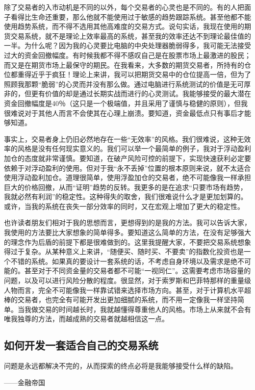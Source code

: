 除了交易者的入市动机是不同的以外，每个交易者的心灵也是不同的。有的人把面子看得比生命还重要，那么他就不能使用过于敏感的趋势跟踪系统。甚至他都不能使用趋势系统，而不得不选用其他高难度的交易方式。说句实话，我现在使用的期货交易系统，就不是理论上效率最高的系统，甚至我的效率还达不到理论最佳值的一半。为什么呢？因为我的心灵要比电脑的中央处理器脆弱得多，我可能无法接受过大的资金回撤幅度。有时候我都不得不感叹自己是在股票市场上最激进的股民；而又是在期货市场上最保守的期民。在我看来，大多数的期货交易者，所持有的仓位都重得近乎于疯狂！理论上来讲，我可以把期货交易中的仓位提高一倍，但为了照顾我那颗“脆弱”的心灵而并没有那么做。通过电脑进行系统测试的价值是无可厚非的，但更有价值的却是通过长期实战而进行的心灵测试。我能够接受的最大潜在资金回撤幅度是40％（这只是一个极端值，并且采用了谨慎与稳健的原则），但我很难说对于其他人而言不会使其在心理上崩溃。要知道，资金最低点只有事后才能够知道。

事实上，交易者身上仍旧必然地存在一些“无效率”的风格。我们很难说，这种无效率的风格是没有任何现实意义的。我们可以举一个最简单的例子，我对于浮动盈利加仓的态度就非常谨慎。要知道，在破产风险可控的前提下，实现快速获利必定要依赖于对浮动盈利的使用。但对于我“永不丢掉”位置的根本原则来说，就不太适合使用浮动盈利加仓。道理很简单，使用浮盈加仓的交易者，绝不可能像我一样承担巨大的价格回撤，从而“证明”趋势的反转。我更多的是在追求“只要市场有趋势，我就必然有利润”的稳定性。这种得失的取舍，我们很难说什么才是更加划算的。或许，当我的系统在丧失一部分效率的同时，又在宏观上增加了更大的稳定性。

也许读者朋友们相对于我的思想而言，更想得到的是我的方法。我可以告诉大家，我使用的方法要比大家想象的简单得多。要知道这么简单的方法，在没有足够强大的理念作为后盾的前提下都是很难做到的。这里我提醒大家，不要把交易系统想象得过于复杂。从某种意义上来讲，“随便买、随时买、不要卖”的指数化投资也是一个不错的系统。如果真的要设计一套系统的话，不考虑自身环境以及需求是绝不可能的。甚至对于不同资金量的交易者都不可能“一视同仁”。这需要考虑市场容量的问题，以及可以进行风险分散的程度。很显然，对于索罗斯和巴菲特那样的重量级人物而言，完全不可能像我一样靠试错来选择市场方向。甚至，对于计算机水平超棒的交易者，也完全有可能开发出更加细腻的系统，而不用一定像我一样坚持简单。当我做交易的时间越长时，我就越懂得尊重他人的风格。市场上从来就不会有唯我独尊的方法，而越成熟的交易者就越相信这一点。

\subsection{如何开发一套适合自己的交易系统}

{\kaishu
问题是永远都解决不完的，从而探索的终点必将是我能够接受什么样的缺陷。

\hfill ——金融帝国
}

